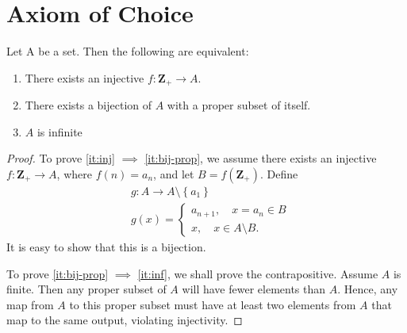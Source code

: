 \section{Axiom of Choice}
\begin{theorem}
	Let A be a set. Then the following are equivalent:
	\begin{enumerate}
		\item\label{it:inj} There exists an injective $f: \mathbf{Z}_{+} \to A$.
		\item\label{it:bij-prop} There exists a bijection of $A$ with a proper subset of itself.
		\item\label{it:inf} $A$ is infinite
	\end{enumerate}
	\label{thm:inj-mapping}
\end{theorem}
\begin{proof}
	To prove \cref{it:inj} $\implies$ \cref{it:bij-prop}, we assume there exists an injective $f: \mathbf{Z}_{+} \to A$, where $f(n) =
	a_{n}$, and let $B = f(\mathbf{Z}_{+})$. Define
	\begin{equation*}
		\begin{split}
			& g: A \to A \setminus \left\{ a_{1} \right\} \\
			& g(x) = \begin{cases}
				a_{n+1}, \quad x = a_{n} \in B \\
				x, \quad x \in A \setminus B.
			\end{cases}
		\end{split}
	\end{equation*} It is easy to show that this is a bijection.

	To prove \cref{it:bij-prop} $\implies$ \cref{it:inf}, we shall prove the
	contrapositive. Assume $A$ is finite. Then any proper subset of $A$ will have
	fewer elements than $A$. Hence, any map from $A$ to this proper subset must
	have at least two elements from $A$ that map to the same output, violating
	injectivity.


\end{proof}
